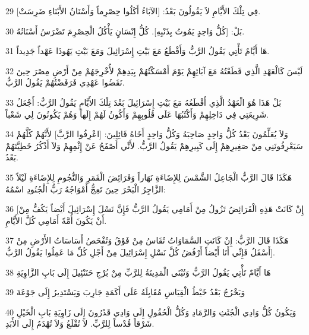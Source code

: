 \par 29 فِي تِلْكَ الأَيَّامِ لاَ يَقُولُونَ بَعْدُ: [الآبَاءُ أَكَلُوا حِصْرِماً وَأَسْنَانُ الأَبْنَاءِ ضَرِسَتْ].
\par 30 بَلْ: [كُلُّ وَاحِدٍ يَمُوتُ بِذَنْبِهِ]. كُلُّ إِنْسَانٍ يَأْكُلُ الْحِصْرِمَ تَضْرَسُ أَسْنَانُهُ.
\par 31 هَا أَيَّامٌ تَأْتِي يَقُولُ الرَّبُّ وَأَقْطَعُ مَعَ بَيْتِ إِسْرَائِيلَ وَمَعَ بَيْتِ يَهُوذَا عَهْداً جَدِيداً.
\par 32 لَيْسَ كَالْعَهْدِ الَّذِي قَطَعْتُهُ مَعَ آبَائِهِمْ يَوْمَ أَمْسَكْتُهُمْ بِيَدِهِمْ لأُخْرِجَهُمْ مِنْ أَرْضِ مِصْرَ حِينَ نَقَضُوا عَهْدِي فَرَفَضْتُهُمْ يَقُولُ الرَّبُّ.
\par 33 بَلْ هَذَا هُوَ الْعَهْدُ الَّذِي أَقْطَعُهُ مَعَ بَيْتِ إِسْرَائِيلَ بَعْدَ تِلْكَ الأَيَّامِ يَقُولُ الرَّبُّ: أَجْعَلُ شَرِيعَتِي فِي دَاخِلِهِمْ وَأَكْتُبُهَا عَلَى قُلُوبِهِمْ وَأَكُونُ لَهُمْ إِلَهاً وَهُمْ يَكُونُونَ لِي شَعْباً.
\par 34 وَلاَ يُعَلِّمُونَ بَعْدُ كُلُّ وَاحِدٍ صَاحِبَهُ وَكُلُّ وَاحِدٍ أَخَاهُ قَائِلِينَ: [اعْرِفُوا الرَّبَّ] لأَنَّهُمْ كُلَّهُمْ سَيَعْرِفُونَنِي مِنْ صَغِيرِهِمْ إِلَى كَبِيرِهِمْ يَقُولُ الرَّبُّ. لأَنِّي أَصْفَحُ عَنْ إِثْمِهِمْ وَلاَ أَذْكُرُ خَطِيَّتَهُمْ بَعْدُ.
\par 35 هَكَذَا قَالَ الرَّبُّ الْجَاعِلُ الشَّمْسَ لِلإِضَاءَةِ نَهَاراً وَفَرَائِضَ الْقَمَرِ وَالنُّجُومِ لِلإِضَاءَةِ لَيْلاً الزَّاجِرُ الْبَحْرَ حِينَ تَعِجُّ أَمْوَاجُهُ رَبُّ الْجُنُودِ اسْمُهُ:
\par 36 [إِنْ كَانَتْ هَذِهِ الْفَرَائِضُ تَزُولُ مِنْ أَمَامِي يَقُولُ الرَّبُّ فَإِنَّ نَسْلَ إِسْرَائِيلَ أَيْضاً يَكُفُّ مِنْ أَنْ يَكُونَ أُمَّةً أَمَامِي كُلَّ الأَيَّامِ.
\par 37 هَكَذَا قَالَ الرَّبُّ: إِنْ كَانَتِ السَّمَاوَاتُ تُقَاسُ مِنْ فَوْقُ وَتُفْحَصُ أَسَاسَاتُ الأَرْضِ مِنْ أَسْفَلُ فَإِنِّي أَنَا أَيْضاً أَرْفُضُ كُلَّ نَسْلِ إِسْرَائِيلَ مِنْ أَجْلِ كُلِّ مَا عَمِلُوا يَقُولُ الرَّبُّ].
\par 38 هَا أَيَّامٌ تَأْتِي يَقُولُ الرَّبُّ وَتُبْنَى الْمَدِينَةُ لِلرَّبِّ مِنْ بُرْجِ حَنَنْئِيلَ إِلَى بَابِ الزَّاوِيَةِ
\par 39 وَيَخْرُجُ بَعْدُ خَيْطُ الْقِيَاسِ مُقَابِلَهُ عَلَى أَكَمَةِ جَارِبَ وَيَسْتَدِيرُ إِلَى جَوْعَةَ
\par 40 وَيَكُونُ كُلُّ وَادِي الْجُثَثِ وَالرَّمَادِ وَكُلُّ الْحُقُولِ إِلَى وَادِي قَدْرُونَ إِلَى زَاوِيَةِ بَابِ الْخَيْلِ شَرْقاً قُدْساً لِلرَّبِّ. لاَ تُقْلَعُ وَلاَ تُهْدَمُ إِلَى الأَبَدِ.

